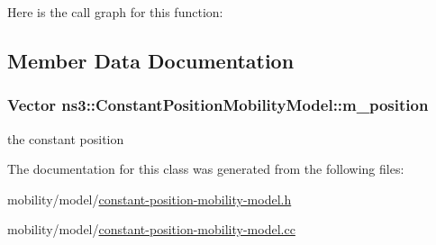 Here is the call graph for this function\+:




\subsection{Member Data Documentation}
\subsubsection[{\texorpdfstring{m\+\_\+position}{m_position}}]{\setlength{\rightskip}{0pt plus 5cm}Vector ns3\+::\+Constant\+Position\+Mobility\+Model\+::m\+\_\+position\hspace{0.3cm}{\ttfamily [private]}}\hypertarget{classns3_1_1ConstantPositionMobilityModel_a6c5b0c0e334ffa40cc3480a94c8bd526}{}\label{classns3_1_1ConstantPositionMobilityModel_a6c5b0c0e334ffa40cc3480a94c8bd526}


the constant position 



The documentation for this class was generated from the following files\+:\begin{DoxyCompactItemize}
\item 
mobility/model/\hyperlink{constant-position-mobility-model_8h}{constant-\/position-\/mobility-\/model.\+h}\item 
mobility/model/\hyperlink{constant-position-mobility-model_8cc}{constant-\/position-\/mobility-\/model.\+cc}\end{DoxyCompactItemize}
